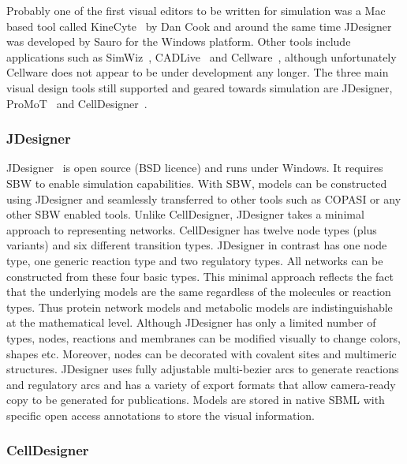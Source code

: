 \documentclass[12pt]{article}
\begin{document}
Probably one of the first visual editors to be written for
simulation was a Mac based tool called
KineCyte~\citep{Cook:1997,Cook:2001} by Dan Cook and around the same
time JDesigner~\citep{BergmannCP:2006} was developed by Sauro for the
Windows platform. Other tools include applications such as
SimWiz~\citep{Rost:2004}, CADLive~\citep{Kurata:2007} and
Cellware~\citep{Dhar:2004}, although unfortunately Cellware does not
appear to be under development any longer. The three main visual
design tools still supported and geared towards simulation are
JDesigner, ProMoT~\citep{Ginkel:2003} and CellDesigner~\citep{Kitano:2005:Nat-Biotechnol}.

\subsubsection{JDesigner}

JDesigner~\citep{Sauro:Omics,BergmannCP:2006} is open source (BSD
licence) and runs under Windows. It requires SBW to enable
simulation capabilities. With SBW, models can be constructed using
JDesigner and seamlessly transferred to other tools such as COPASI
or any other SBW enabled tools. Unlike CellDesigner, JDesigner takes
a minimal approach to representing networks. CellDesigner has twelve
node types (plus variants) and six different transition types.
JDesigner in contrast has one node type, one generic reaction type
and two regulatory types. All networks can be constructed from these
four basic types. This minimal approach reflects the fact that the
underlying models are the same regardless of the molecules or
reaction types. Thus protein network models and metabolic models are
indistinguishable at the mathematical level. Although JDesigner has
only a limited number of types, nodes, reactions and membranes can
be modified visually to change colors, shapes etc. Moreover, nodes
can be decorated with covalent sites and multimeric structures.
JDesigner uses fully adjustable multi-bezier arcs to generate
reactions and regulatory arcs and has a variety of export formats
that allow camera-ready copy to be generated for publications.
Models are stored in native SBML with specific open access annotations to store
the visual information.

\subsubsection{CellDesigner}
\end{document}
